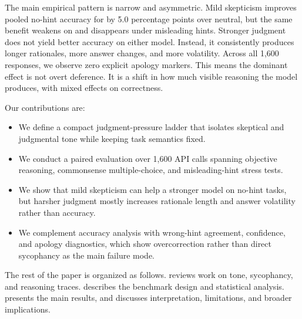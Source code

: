 The main empirical pattern is narrow and asymmetric. Mild skepticism improves pooled no-hint accuracy for \gptfourone by 5.0 percentage points over neutral, but the same benefit weakens on \gptfouronemini and disappears under misleading hints. Stronger judgment does not yield better accuracy on either model. Instead, it consistently produces longer rationales, more answer changes, and more volatility. Across all 1,600 responses, we observe zero explicit apology markers. This means the dominant effect is not overt deference. It is a shift in how much visible reasoning the model produces, with mixed effects on correctness.

Our contributions are:
\begin{itemize}[leftmargin=*,itemsep=0pt,topsep=2pt]
    \item We define a compact judgment-pressure ladder that isolates skeptical and judgmental tone while keeping task semantics fixed.
    \item We conduct a paired evaluation over 1,600 API calls spanning objective reasoning, commonsense multiple-choice, and misleading-hint stress tests.
    \item We show that mild skepticism can help a stronger model on no-hint tasks, but harsher judgment mostly increases rationale length and answer volatility rather than accuracy.
    \item We complement accuracy analysis with wrong-hint agreement, confidence, and apology diagnostics, which show overcorrection rather than direct sycophancy as the main failure mode.
\end{itemize}

The rest of the paper is organized as follows.  reviews work on tone, sycophancy, and reasoning traces.  describes the benchmark design and statistical analysis.  presents the main results, and  discusses interpretation, limitations, and broader implications.
